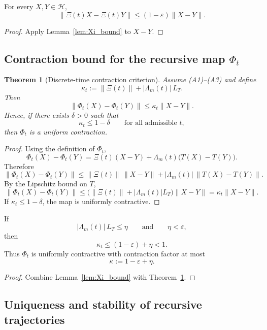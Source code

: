 \documentclass[12pt]{amsart}
\theoremstyle{plain}
\newtheorem{theorem}{Theorem}[section]
\begin{document}
\begin{corollary}
For every \(X,Y\in\mathcal H\),
\[
\|\Xi(t)X-\Xi(t)Y\|
\le
(1-\varepsilon)\|X-Y\|.
\]
\end{corollary}

\begin{proof}
Apply Lemma~\ref{lem:Xi_bound} to \(X-Y\).
\end{proof}

\subsection{Contraction bound for the recursive map \(\Phi_t\)}

\begin{theorem}[Discrete-time contraction criterion]
\label{thm:Phi_contraction}
Assume \textup{(A1)}--\textup{(A3)} and define
\[
\kappa_t := \|\Xi(t)\| + |\Lambda_m(t)|\,L_T.
\]
Then
\[
\|\Phi_t(X)-\Phi_t(Y)\|
\le
\kappa_t \|X-Y\|.
\]
Hence, if there exists \(\delta>0\) such that
\[
\kappa_t \le 1-\delta
\qquad
\text{for all admissible } t,
\]
then \(\Phi_t\) is a uniform contraction.
\end{theorem}

\begin{proof}
Using the definition of \(\Phi_t\),
\[
\Phi_t(X)-\Phi_t(Y)
=
\Xi(t)(X-Y)+\Lambda_m(t)\bigl(T(X)-T(Y)\bigr).
\]
Therefore
\[
\|\Phi_t(X)-\Phi_t(Y)\|
\le
\|\Xi(t)\|\,\|X-Y\|
+
|\Lambda_m(t)|\,\|T(X)-T(Y)\|.
\]
By the Lipschitz bound on \(T\),
\[
\|\Phi_t(X)-\Phi_t(Y)\|
\le
\bigl(\|\Xi(t)\|+|\Lambda_m(t)|L_T\bigr)\|X-Y\|
=
\kappa_t \|X-Y\|.
\]
If \(\kappa_t\le 1-\delta\), the map is uniformly contractive.
\end{proof}

\begin{corollary}
\label{cor:explicit_condition}
If
\[
|\Lambda_m(t)|\,L_T \le \eta
\qquad\text{and}\qquad
\eta<\varepsilon,
\]
then
\[
\kappa_t \le (1-\varepsilon)+\eta < 1.
\]
Thus \(\Phi_t\) is uniformly contractive with contraction factor at most
\[
\kappa := 1-\varepsilon+\eta.
\]
\end{corollary}

\begin{proof}
Combine Lemma~\ref{lem:Xi_bound} with Theorem~\ref{thm:Phi_contraction}.
\end{proof}

\subsection{Uniqueness and stability of recursive trajectories}
\end{document}

